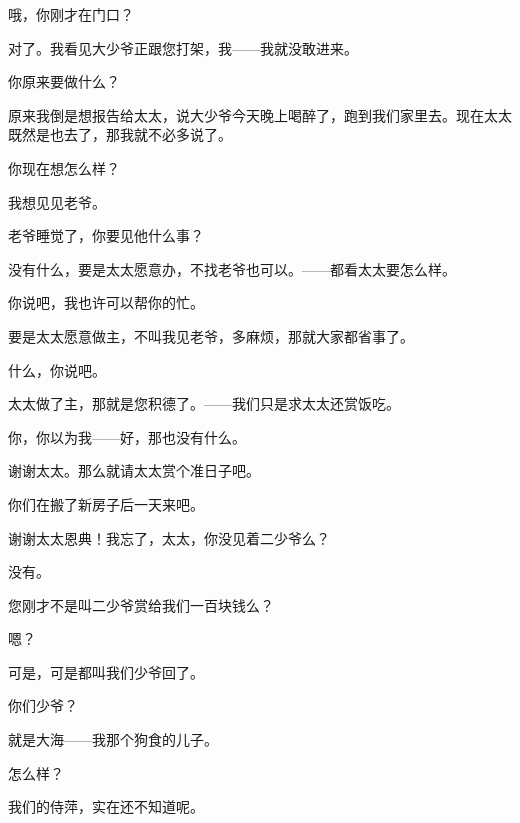 哦，你刚才在门口？

对了。我看见大少爷正跟您打架，我——我就没敢进来。

你原来要做什么？

原来我倒是想报告给太太，说大少爷今天晚上喝醉了，跑到我们家里去。现在太太既然是也去了，那我就不必多说了。

你现在想怎么样？

我想见见老爷。

老爷睡觉了，你要见他什么事？

没有什么，要是太太愿意办，不找老爷也可以。——都看太太要怎么样。

你说吧，我也许可以帮你的忙。

要是太太愿意做主，不叫我见老爷，多麻烦，那就大家都省事了。

什么，你说吧。

太太做了主，那就是您积德了。——我们只是求太太还赏饭吃。

你，你以为我——好，那也没有什么。

谢谢太太。那么就请太太赏个准日子吧。

你们在搬了新房子后一天来吧。

谢谢太太恩典！我忘了，太太，你没见着二少爷么？

没有。

您刚才不是叫二少爷赏给我们一百块钱么？

嗯？

可是，可是都叫我们少爷回了。

你们少爷？

就是大海——我那个狗食的儿子。

怎么样？

我们的侍萍，实在还不知道呢。

